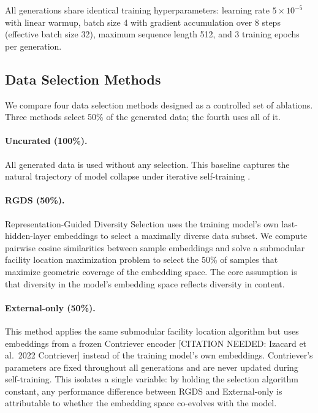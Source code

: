 All generations share identical training hyperparameters: learning rate $5 \times 10^{-5}$ with linear warmup, batch size 4 with gradient accumulation over 8 steps (effective batch size 32), maximum sequence length 512, and 3 training epochs per generation.

\subsection{Data Selection Methods}

We compare four data selection methods designed as a controlled set of ablations. Three methods select 50\% of the generated data; the fourth uses all of it.

\paragraph{Uncurated (100\%).} All generated data is used without any selection. This baseline captures the natural trajectory of model collapse under iterative self-training \citep{shumailov2024ai, alemohammad2024self}.

\paragraph{RGDS (50\%).} Representation-Guided Diversity Selection uses the training model's own last-hidden-layer embeddings to select a maximally diverse data subset. We compute pairwise cosine similarities between sample embeddings and solve a submodular facility location maximization problem \citep{wei2015submodularity, iyer2013submodular} to select the 50\% of samples that maximize geometric coverage of the embedding space. The core assumption is that diversity in the model's embedding space reflects diversity in content.

\paragraph{External-only (50\%).} This method applies the same submodular facility location algorithm but uses embeddings from a frozen Contriever encoder [CITATION NEEDED: Izacard et al.\ 2022 Contriever] instead of the training model's own embeddings. Contriever's parameters are fixed throughout all generations and are never updated during self-training. This isolates a single variable: by holding the selection algorithm constant, any performance difference between RGDS and External-only is attributable to whether the embedding space co-evolves with the model.

